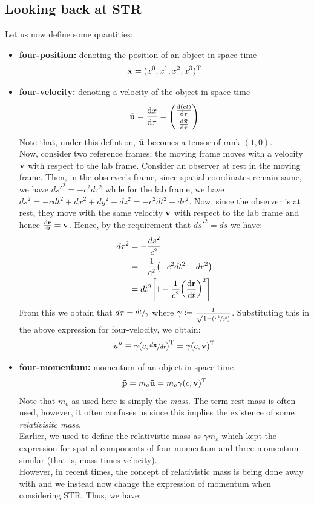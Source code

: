 \subsection{Looking back at STR }
Let us now define some quantities:
\begin{itemize}
    \item \textbf{four-position:} denoting the position of an object in space-time $$\vb{\bar{x}}=(x^0,x^1,x^2,x^3)^\mathrm{T}$$
    \item \textbf{four-velocity:} denoting a velocity of the object in space-time $$\vb{\bar{u}} = \dv{\bar{x}}{\tau} = \setlength{\arraycolsep}{12pt}   %
\renewcommand{\arraystretch}{1.35}%
\begin{pmatrix}
        \dv{(ct)}{\tau}\\ \dv{\vb{\bar{x}}}{\tau}
    \end{pmatrix}$$
    Note that, under this defintion, $\vb{\bar{u}}$ becomes a tensor of rank $(1,0)$. \\[0.2cm] Now, consider two reference frames; the moving frame moves with a velocity $\vb{v}$ with respect to the lab frame. Consider an observer at rest in the moving frame. Then, in the observer's frame, since spatial coordinates remain same, we have $ds'^2 = -c^2d\tau^2$ while for the lab frame, we have $ds^2 = -cdt^2+dx^2+dy^2+dz^2 = -c^2dt^2 +dr^2$. Now, since the observer is at rest, they move with the same velocity $\vb{v}$ with respect to the lab frame and hence $\dv{\vb{r}}{t}=\vb{v}$. Hence, by the requirement that $ds'^2=ds$ we have:
    \begin{equation}
        \begin{aligned}\label{eqn:prop}
        d\tau^2 &= -\frac{ds^2}{c^2}\\
        &=-\frac{1}{c^2}\qty(-c^2dt^2+dr^2)\\
        &=dt^2\qty[1- \frac{1}{c^2}\qty(\dv{\vb{r}}{t})^2]
    \end{aligned}
    \end{equation}
    From this we obtain that $d\tau = \sfrac{dt}{\gamma}$ where $\gamma :=\frac{1}{\sqrt{1- \qty(\sfrac{v^2}{c^2})}}$.
    Substituting this in the above expression for four-velocity, we obtain:
    $$u^\mu \equiv \gamma\qty(c , \sfrac{d\vb{x}}{dt})^\mathrm{T} = \gamma (c,\vb{v})^\mathrm{T}$$
    \item \textbf{four-momentum:} momentum of an object in space-time 
    $$\vb{\bar{p}} = m_o \vb{\bar{u}} = m_o\gamma(c,\vb{{v}})^\mathrm{T}$$ 
    Note that $m_o$ as used here is simply the \textit{mass}. The term rest-mass is often used, however, it often confuses us since this implies the existence of some \textit{relativisitc mass}.\\[0.2cm] Earlier, we used to define the relativistic mass as $\gamma m_o$ which kept the expression for spatial components of four-momentum and three momentum similar (that is, mass times velocity). \\[0.2cm] However, in recent times, the concept of relativistic mass is being done away with and we instead now change the expression of momentum when considering STR. Thus, we have:

\end{itemize}
